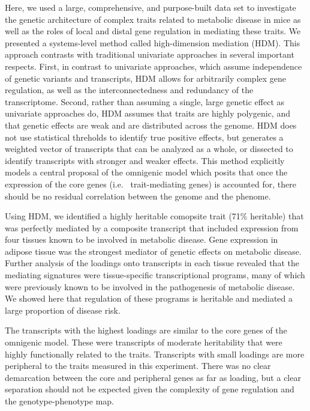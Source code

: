 \documentclass[
]{article}
\begin{document}
Here, we used a large, comprehensive, and purpose-built data set to
investigate the genetic architecture of complex traits related to
metabolic disease in mice as well as the roles of local and distal gene
regulation in mediating these traits. We presented a systems-level
method called high-dimension mediation (HDM). This approach contrasts
with traditional univariate approaches in several important respects.
First, in contrast to univariate approaches, which assume independence
of genetic variants and transcripts, HDM allows for arbitrarily complex
gene regulation, as well as the interconnectedness and redundancy of the
transcriptome. Second, rather than assuming a single, large genetic
effect as univariate approaches do, HDM assumes that traits are highly
polygenic, and that genetic effects are weak and are distributed across
the genome. HDM does not use statistical threholds to identify true
positive effects, but generates a weighted vector of transcripts that
can be analyzed as a whole, or dissected to identify transcripts with
stronger and weaker effects. This method explicitly models a central
proposal of the omnigenic model which posits that once the expression of
the core genes (i.e.~ trait-mediating genes) is accounted for, there
should be no residual correlation between the genome and the phenome.

Using HDM, we identified a highly heritable comopsite trait (71\%
heritable) that was perfectly mediated by a composite transcript that
included expression from four tissues known to be involved in metabolic
disease. Gene expression in adipose tissue was the strongest mediator of
genetic effects on metabolic disease. Further analysis of the loadings
onto transcripts in each tissue revealed that the mediating signatures
were tissue-specific transcriptional programs, many of which were
previously known to be involved in the pathogenesis of metabolic
disease. We showed here that regulation of these programs is heritable
and mediated a large proportion of disease risk.

The transcripts with the highest loadings are similar to the core genes
of the omnigenic model. These were transcripts of moderate heritability
that were highly functionally related to the traits. Transcripts with
small loadings are more peripheral to the traits measured in this
experiment. There was no clear demarcation between the core and
peripheral genes as far as loading, but a clear separation should not be
expected given the complexity of gene regulation and the
genotype-phenotype map.
\end{document}
